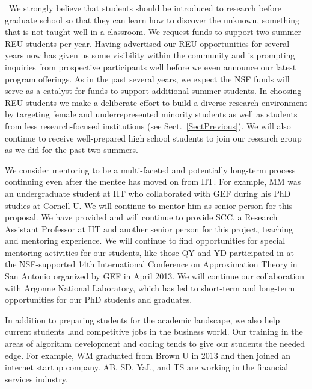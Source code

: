 \documentclass[11pt]{NSFamsart}
\begin{document}
\begin{description}[leftmargin=0ex]
\item[Providing Research Experiences for Undergraduates and High School Students]\ We \linebreak[4]    strongly believe that students should be introduced to research before graduate school so that they can learn how to discover the unknown, something that is not taught well in a classroom. We request funds to support two summer REU students per year. Having advertised our REU opportunities for several years now has given us some visibility within the community and is prompting inquiries from prospective participants well before we even announce our latest program offerings. As in the past several years, we expect the NSF funds will serve as a catalyst for funds to support additional summer students. In choosing REU students we make a deliberate effort to build a diverse research environment by targeting female and underrepresented minority students as well as students from less research-focused institutions (see Sect.~\ref{SectPrevious}). We will also continue to receive well-prepared high school students to join our research group as we did for the past two summers.

\item[Preparing Students for Academic Careers] We consider mentoring to be a multi-faceted and potentially long-term process continuing even after the mentee has moved on from IIT.  For example, MM was an undergraduate student at IIT who collaborated with GEF during his PhD studies at Cornell U.  We will continue to mentor him as senior person for this proposal.
    We have provided and will continue to provide SCC, a Research Assistant Professor at IIT and another senior person for this project, teaching and mentoring experience.  We will continue to find opportunities for special mentoring activities for our students, like those QY and YD participated in at the NSF-supported 14th International Conference on Approximation Theory in San Antonio organized by GEF in April 2013.  We  will continue our collaboration with Argonne National Laboratory, which has led to short-term and long-term opportunities for our PhD students and graduates.

\item[Preparing Students for Industry Careers]
In addition to preparing students for the academic landscape, we also help current students land competitive jobs in the business world. Our training in the areas of algorithm development and coding tends to give our students the needed edge. For example, WM graduated from Brown U in 2013 and then joined an internet startup company. AB, SD, YaL, and TS are working in the financial services industry.


\end{description}
\end{document}

